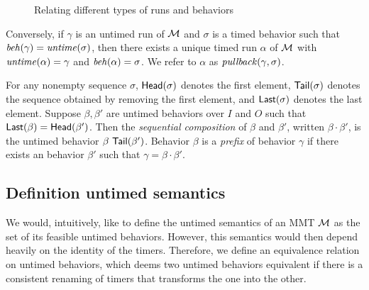 \begin{figure}[h]
\centering
{}
\caption{Relating different types of runs and behaviors}
\label{fig:diagram}
\end{figure}
Conversely,
\fi
if $\gamma$ is an untimed run  of ${\mathcal M}$ and $\sigma$ is a timed behavior such that $\mathit{beh}(\gamma) = \mathit{untime}(\sigma)$,
then there exists a unique timed run $\alpha$ of ${\mathcal M}$ with $\mathit{untime}(\alpha) = \gamma$ and $\mathit{beh}(\alpha) = \sigma$.
We refer to $\alpha$ as $\mathit{pullback}(\gamma,\sigma)$.

For any nonempty sequence $\sigma$, $\mathsf{Head}({\sigma})$ denotes the first element, $\mathsf{Tail}({\sigma})$ denotes the sequence obtained by removing the first element, and $\mathsf{Last}({\sigma})$ denotes the last element.
Suppose $\beta, \beta'$ are untimed behaviors over $I$ and $O$ such that $\mathsf{Last}({\beta}) = \mathsf{Head}({\beta'})$.
Then the \emph{sequential composition} of $\beta$ and $\beta'$, written $\beta \cdot \beta'$, is the untimed behavior $\beta ~ \mathsf{Tail}({\beta'})$.
Behavior $\beta$ is a \emph{prefix} of behavior $\gamma$ if there exists an behavior $\beta'$ such that $\gamma = \beta \cdot \beta'$.

\subsection{Definition untimed semantics}
We would, intuitively, like to define the untimed semantics of an MMT ${\mathcal M}$ as the set of its feasible untimed behaviors.
However, this semantics would then depend heavily on the identity of the timers. Therefore, we define an equivalence relation
on untimed behaviors, which deems two untimed behaviors equivalent if there is a consistent renaming of timers that transforms
the one into the other.

